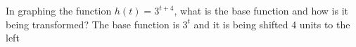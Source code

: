 {In graphing the function $h(t)=3^{t+4}$, what is the base function and how is it being transformed?}
{The base function is $3^t$ and it is being shifted 4 units to the left}
